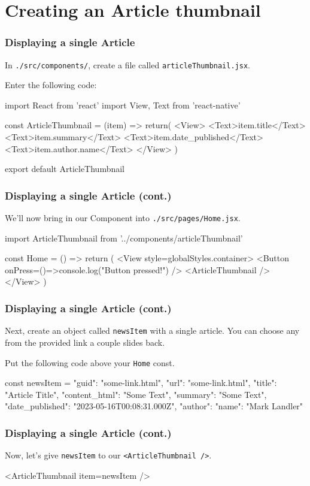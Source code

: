 \documentclass{beamer}
\begin{document}
  \section{Creating an Article thumbnail}
  \begin{frame}[fragile]
    \frametitle{Displaying a single Article}
    In \verb|./src/components/|, create a file called \verb|articleThumbnail.jsx|.

    Enter the following code: 

    \begin{jscodesmall}
import React from 'react'
import {View, Text} from 'react-native'

const ArticleThumbnail = ({item}) => {
  return(
    <View>
      <Text>{item.title}</Text>
      <Text>{item.summary}</Text>
      <Text>{item.date_published}</Text>
      <Text>{item.author.name}</Text>
    </View>
  )
}

export default ArticleThumbnail
    \end{jscodesmall}
  \end{frame}
  \begin{frame}[fragile]
    \frametitle{Displaying a single Article (cont.)}
    We'll now bring in our Component into \verb|./src/pages/Home.jsx|. 

    \begin{jscodesmall}
import ArticleThumbnail from '../components/articleThumbnail'

const Home = () => {
  return (
    <View style={globalStyles.container}>
      <Button onPress={()=>{console.log("Button pressed!")}} />
      <ArticleThumbnail />
    </View>
  )
}
    \end{jscodesmall}
  \end{frame}
  \begin{frame}[fragile]
    \frametitle{Displaying a single Article (cont.)}
    Next, create an object called \verb|newsItem| with a single article. 
    You can choose any from the provided link a couple slides back.

    Put the following code above your \verb|Home| const.

    \begin{jscodesmall}
const newsItem = {
  "guid": "some-link.html",
  "url": "some-link.html",
  "title": "Article Title",
  "content_html": "Some Text",
  "summary": "Some Text",
  "date_published": "2023-05-16T00:08:31.000Z",
  "author": {
    "name": "Mark Landler"
  }
}
    \end{jscodesmall}
  \end{frame}
  \begin{frame}[fragile]
    \frametitle{Displaying a single Article (cont.)}
    Now, let's give \verb|newsItem| to our \verb|<ArticleThumbnail />|.

    \begin{jscode}
<ArticleThumbnail item={newsItem} />
    \end{jscode}
  \end{frame}
\end{document}
